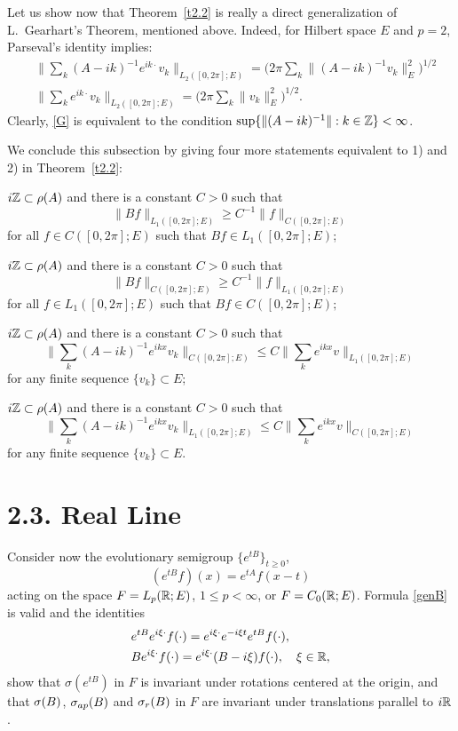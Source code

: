 Let us show now that Theorem~\ref{t2.2} is really a direct generalization
of L.~Gearhart's Theorem, mentioned above.  Indeed, for Hilbert space $E$ and
$p=2$, Parseval's identity implies:
\begin{align*}
& \|\sum_k (A-ik)^{-1} e^{ik\cdot} v_k\|_{L_2 ([0,2\pi];E)} =\Big( 2\pi
\sum_k \|(A-ik)^{-1} v_k \|_E^2\Big)^{1/2}\\
& \| \sum_k e^{ik\cdot} v_k \|_{L_2 ([0,2\pi];E)} =\Big( 2\pi \sum_k
\|v_k\|_E^2\Big)^{1/2}.
\end{align*}
Clearly, \eqref{G} is equivalent to the condition
$\sup \{\|(A-ik)^{-1} \|:
k\in{\Bbb{Z}} \} < \infty$.

We conclude this subsection by giving four more statements equivalent
to 1) and 2) in Theorem~\ref{t2.2}:

\begin{list}{)}{}\setcounter{aa}{2}
\item $i{\Bbb{Z}} \subset \rho (A)$ and there is a constant $C>0$ such that
$$
 \|Bf\|_{L_1([0,2\pi]; E)}\geq
 C^{-1}\|f\|_{C([0, 2\pi];E)}$$ for all  $f\in
C([0, 2\pi]; E)$ such that $ Bf\in L_1([0,2\pi]; E)$;
\item $i{\Bbb{Z}} \subset \rho (A)$ and there is a constant $C>0$ such that
$$\|Bf\|_{C([0, 2\pi];E)}\geq
 C^{-1}\|f\|_{L_1([0,2\pi]; E)}$$ for all
$f\in L_1([0,2\pi]; E)$ such that  $Bf\in C([0, 2\pi]; E);$
\item $i{\Bbb{Z}} \subset \rho (A)$ and there is a constant $C>0$ such that
\begin{equation*}
\|\sum_k (A-ik)^{-1}e^{ikx} v_k\|_{C([0, 2\pi];E)}
\leq C\| \sum_k
e^{ikx} v\|_{L_1([0,2\pi]; E)}
\end{equation*}
for any finite sequence $\{v_k\}\subset E$;
\item $i{\Bbb{Z}} \subset \rho (A)$ and there is a constant $C>0$ such that
\begin{equation*}
\|\sum_k (A-ik)^{-1}e^{ikx} v_k\|_{L_1([0,2\pi]; E)}
\leq C\| \sum_k
e^{ikx} v\|_{C([0, 2\pi];E)}
\end{equation*}
for any finite sequence $\{v_k\}\subset E$.
\end{list}


\section*{2.3.  Real Line} \label{sub2.3}
Consider now the evolutionary
semigroup $\{e^{tB}\}_{t\geq 0}$,
\begin{equation}\label{evolaut}
(e^{tB} f)(x)
=e^{tA}f(x-t)
\end{equation}
acting on the space $F=L_p ({\Bbb{R}};E)$, $1\leq p <\infty$,
or $F=C_0 ({\Bbb{R}};E)$.  Formula
\eqref{genB} is valid and the identities
\begin{align*}
& e^{tB}e^{i\xi\cdot } f(\cdot )=
e^{i\xi\cdot } e^{-i\xi t} e^{tB} f(\cdot ), \\
& Be^{i\xi\cdot }f(\cdot) =e^{i\xi \cdot} (B- i\xi ) f(\cdot),\quad \xi
\in{\Bbb{R}},
\end{align*}
show that
$\sigma (e^{tB})$ in $F$ is invariant under rotations
centered at the origin, and that
$\sigma(B)$, $\sigma_{ap} (B)$ and $\sigma_r (B)$ in $F$
are invariant under translations parallel to $i{\Bbb{R}}$.

